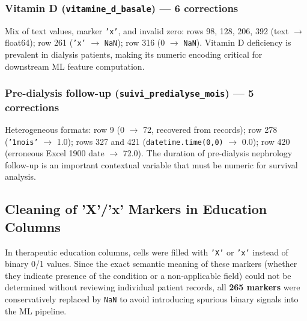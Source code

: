 \documentclass[12pt,a4paper,twoside]{report}
\begin{document}
\subsubsection{Vitamin D (\texttt{vitamine\_d\_basale}) — 6 corrections}

Mix of text values, marker \texttt{'x'}, and invalid zero: rows 98, 128, 206, 392 (text $\rightarrow$ float64); row 261 (\texttt{'x'} $\rightarrow$ \texttt{NaN}); row 316 (0 $\rightarrow$ \texttt{NaN}). Vitamin D deficiency is prevalent in dialysis patients, making its numeric encoding critical for downstream ML feature computation.

\subsubsection{Pre-dialysis follow-up (\texttt{suivi\_predialyse\_mois}) — 5 corrections}

Heterogeneous formats: row 9 (0 $\rightarrow$ 72, recovered from records); row 278 (\texttt{'1mois'} $\rightarrow$ 1.0); rows 327 and 421 (\texttt{datetime.time(0,0)} $\rightarrow$ 0.0); row 420 (erroneous Excel 1900 date $\rightarrow$ 72.0). The duration of pre-dialysis nephrology follow-up is an important contextual variable that must be numeric for survival analysis.

\subsection{Cleaning of 'X'/'x' Markers in Education Columns}

In therapeutic education columns, cells were filled with \texttt{'X'} or \texttt{'x'} instead of binary 0/1 values. Since the exact semantic meaning of these markers (whether they indicate presence of the condition or a non-applicable field) could not be determined without reviewing individual patient records, all \textbf{265 markers} were conservatively replaced by \texttt{NaN} to avoid introducing spurious binary signals into the ML pipeline.
\end{document}
